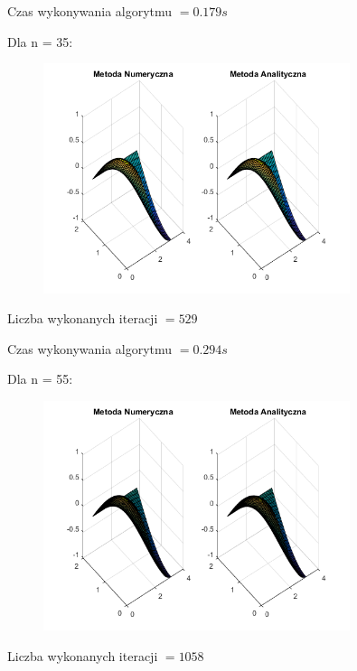 Czas wykonywania algorytmu $ = 0.179 s$

Dla n = 35:

\begin{figure}[!ht]
	\begin{center}
		\includegraphics[width=0.8\textwidth]{Lab6/charts/jacobi/zad2/35.png}
	\end{center}
\end{figure}

Liczba wykonanych iteracji $ = 529 $

Czas wykonywania algorytmu $ = 0.294 s$

\newpage

Dla n = 55:

\begin{figure}[!ht]
	\begin{center}
		\includegraphics[width=0.8\textwidth]{Lab6/charts/jacobi/zad2/55.png}
	\end{center}
\end{figure}

Liczba wykonanych iteracji $ = 1058 $


